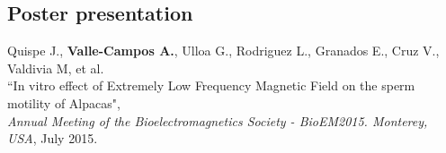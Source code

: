 \documentclass[margin,line]{res}
\newenvironment{list2}{
  \begin{list}{$\bullet$}{%
      \setlength{\itemsep}{0in}
      \setlength{\parsep}{0in} \setlength{\parskip}{0in}
      \setlength{\topsep}{0in} \setlength{\partopsep}{0in}
      \setlength{\leftmargin}{0.2in}}}{\end{list}}
\begin{document}
\begin{resume}



\section{\sc Poster presentation}

Quispe J., \textbf{Valle-Campos A.}, Ulloa G., Rodriguez L., Granados E., Cruz V., Valdivia M, et al.\\ ``In vitro effect of Extremely Low Frequency Magnetic Field on the sperm motility of Alpacas", \\ {\em Annual Meeting of the Bioelectromagnetics Society - BioEM2015. Monterey, USA}, July 2015.\\%




\end{resume}
\end{document}
